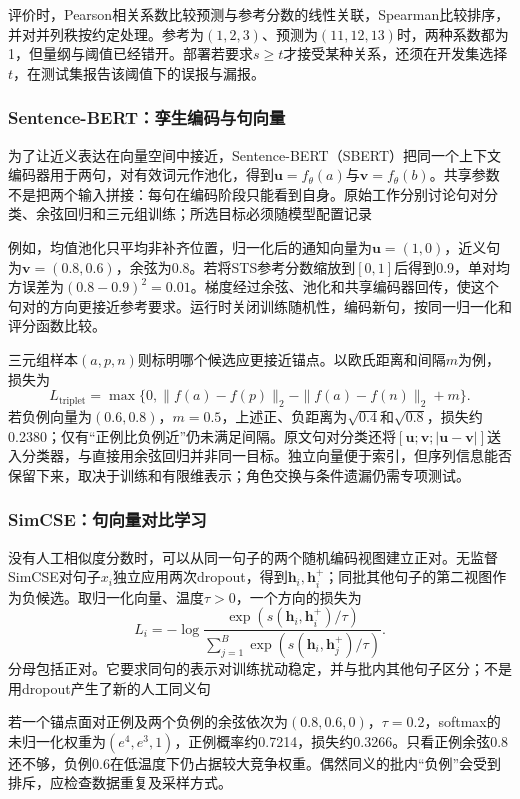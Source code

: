 评价时，Pearson相关系数比较预测与参考分数的线性关联，Spearman比较排序，并对并列秩按约定处理。参考为$(1,2,3)$、预测为$(11,12,13)$时，两种系数都为1，但量纲与阈值已经错开。部署若要求$s\geq t$才接受某种关系，还须在开发集选择$t$，在测试集报告该阈值下的误报与漏报。

\subsubsection{Sentence-BERT：孪生编码与句向量}
\label{sec:nlp-classification-sbert}

为了让近义表达在向量空间中接近，Sentence-BERT（SBERT）把同一个上下文编码器用于两句，对有效词元作池化，得到$\bm u=f_\theta(a)$与$\bm v=f_\theta(b)$。共享参数不是把两个输入拼接：每句在编码阶段只能看到自身。原始工作分别讨论句对分类、余弦回归和三元组训练；所选目标必须随模型配置记录

例如，均值池化只平均非补齐位置，归一化后的通知向量为$\bm u=(1,0)$，近义句为$\bm v=(0.8,0.6)$，余弦为0.8。若将STS参考分数缩放到$[0,1]$后得到0.9，单对均方误差为$(0.8-0.9)^2=0.01$。梯度经过余弦、池化和共享编码器回传，使这个句对的方向更接近参考要求。运行时关闭训练随机性，编码新句，按同一归一化和评分函数比较。

三元组样本$(a,p,n)$则标明哪个候选应更接近锚点。以欧氏距离和间隔$m$为例，损失为
\[
  L_{\mathrm{triplet}}
  =\max\{0,\|f(a)-f(p)\|_2-\|f(a)-f(n)\|_2+m\}.
\]
若负例向量为$(0.6,0.8)$，$m=0.5$，上述正、负距离为$\sqrt{0.4}$和$\sqrt{0.8}$，损失约0.2380；仅有“正例比负例近”仍未满足间隔。原文句对分类还将$[\bm u;\bm v;|\bm u-\bm v|]$送入分类器，与直接用余弦回归并非同一目标。独立向量便于索引，但序列信息能否保留下来，取决于训练和有限维表示；角色交换与条件遗漏仍需专项测试。

\subsubsection{SimCSE：句向量对比学习}
\label{sec:nlp-classification-simcse}

没有人工相似度分数时，可以从同一句子的两个随机编码视图建立正对。无监督SimCSE对句子$x_i$独立应用两次dropout，得到$\bm h_i,\bm h_i^+$；同批其他句子的第二视图作为负候选。取归一化向量、温度$\tau>0$，一个方向的损失为
\[
  L_i=-\log
  \frac{\exp(s(\bm h_i,\bm h_i^+)/\tau)}
       {\sum_{j=1}^{B}\exp(s(\bm h_i,\bm h_j^+)/\tau)}.
\]
分母包括正对。它要求同句的表示对训练扰动稳定，并与批内其他句子区分；不是用dropout产生了新的人工同义句

若一个锚点面对正例及两个负例的余弦依次为$(0.8,0.6,0)$，$\tau=0.2$，softmax的未归一化权重为$(e^4,e^3,1)$，正例概率约0.7214，损失约0.3266。只看正例余弦0.8还不够，负例0.6在低温度下仍占据较大竞争权重。偶然同义的批内“负例”会受到排斥，应检查数据重复及采样方式。

